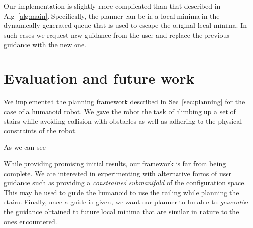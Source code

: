 \documentclass[conference]{IEEEtran}
\begin{document}
Our implementation is slightly more complicated than that described in Alg~\ref{alg:main}.
Specifically, the planner can be in a local minima in the dynamically-generated queue that is used to escape the original local minima. 
In such cases we request new guidance from the user and replace the previous guidance with the new one.

\section{Evaluation and future work}\label{sec:eval}
We implemented the planning framework described in Sec~\ref{sec:planning} for the case of a humanoid robot. We gave the robot the task of climbing up a set of stairs while avoiding collision with obstacles as well as adhering to the physical constraints of the robot.

As we can see 

While providing promising initial results, our framework is far from being complete.
We are interested in experimenting with alternative forms of user guidance such as providing a \emph{constrained submanifold} of the configuration space. This may be used to guide the humanoid to use the railing while planning the stairs.
Finally, once a guide is given, we want our planner to be able to \emph{generalize} the guidance obtained to future local minima that are similar in nature to the ones encountered.


%


\end{document}
